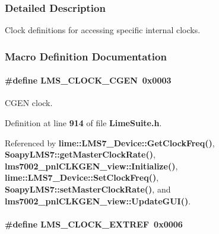 \subsubsection{Detailed Description}
Clock definitions for accessing specific internal clocks. 



\subsubsection{Macro Definition Documentation}
\paragraph[{L\+M\+S\+\_\+\+C\+L\+O\+C\+K\+\_\+\+C\+G\+EN}]{\setlength{\rightskip}{0pt plus 5cm}\#define L\+M\+S\+\_\+\+C\+L\+O\+C\+K\+\_\+\+C\+G\+EN~0x0003}\label{group__LMS__CLOCK__ID_ga02227f47e9f4bc97f2af1be352cf4324}


C\+G\+EN clock. 



Definition at line {\bf 914} of file {\bf Lime\+Suite.\+h}.



Referenced by {\bf lime\+::\+L\+M\+S7\+\_\+\+Device\+::\+Get\+Clock\+Freq()}, {\bf Soapy\+L\+M\+S7\+::get\+Master\+Clock\+Rate()}, {\bf lms7002\+\_\+pnl\+C\+L\+K\+G\+E\+N\+\_\+view\+::\+Initialize()}, {\bf lime\+::\+L\+M\+S7\+\_\+\+Device\+::\+Set\+Clock\+Freq()}, {\bf Soapy\+L\+M\+S7\+::set\+Master\+Clock\+Rate()}, and {\bf lms7002\+\_\+pnl\+C\+L\+K\+G\+E\+N\+\_\+view\+::\+Update\+G\+U\+I()}.

\paragraph[{L\+M\+S\+\_\+\+C\+L\+O\+C\+K\+\_\+\+E\+X\+T\+R\+EF}]{\setlength{\rightskip}{0pt plus 5cm}\#define L\+M\+S\+\_\+\+C\+L\+O\+C\+K\+\_\+\+E\+X\+T\+R\+EF~0x0006}\label{group__LMS__CLOCK__ID_ga42a37126287b107d0c6f40fbb874cf59}


